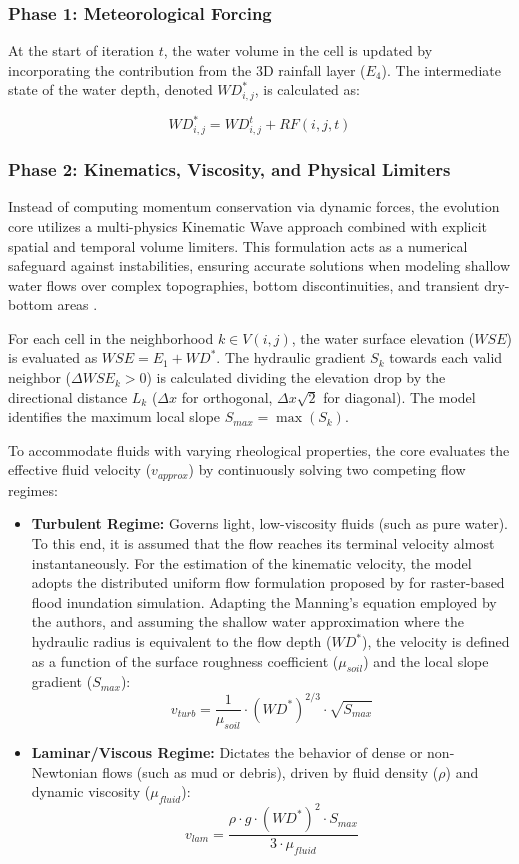 \subsubsection{Phase 1: Meteorological Forcing}

At the start of iteration $t$, the water volume in the cell is updated by incorporating the contribution from the 3D rainfall 
layer ($E_4$). The intermediate state of the water depth, denoted $WD_{i,j}^*$, is calculated as:

$$WD_{i,j}^* = WD_{i,j}^t + RF(i,j,t)$$


\subsubsection{Phase 2: Kinematics, Viscosity, and Physical Limiters}

Instead of computing momentum conservation via dynamic forces, the evolution core utilizes a multi-physics Kinematic Wave 
approach combined with explicit spatial and temporal volume limiters. This formulation acts as a numerical safeguard against 
instabilities, ensuring accurate solutions when modeling shallow water flows over complex topographies, bottom discontinuities, 
and transient dry-bottom areas \parencite{Aleksyuk2017}.

For each cell in the neighborhood $k \in V(i,j)$, the water surface elevation ($WSE$) is evaluated as $WSE = E_1 + WD^*$. The 
hydraulic gradient $S_k$ towards each valid neighbor ($\Delta WSE_k > 0$) is calculated dividing the elevation drop by the 
directional distance $L_k$ ($\Delta x$ for orthogonal, $\Delta x\sqrt{2}$ for diagonal). The model identifies the maximum local 
slope $S_{max} = \max(S_k)$.

To accommodate fluids with varying rheological properties, the core evaluates the effective fluid velocity ($v_{approx}$) by 
continuously solving two competing flow regimes:

\begin{itemize}
    \item \textbf{Turbulent Regime:} Governs light, low-viscosity fluids (such as pure water). To this end, it is assumed that 
    the flow reaches its terminal velocity almost instantaneously. For the estimation of the kinematic velocity, the model adopts 
    the distributed uniform flow formulation proposed by \parencite{Bates2000} for raster-based flood inundation simulation. 
    Adapting the Manning's equation employed by the authors, and assuming the shallow water approximation where the hydraulic 
    radius is equivalent to the flow depth ($WD^*$), the velocity is defined as a function of the surface roughness coefficient 
    ($\mu_{soil}$) and the local slope gradient ($S_{max}$):
    $$v_{turb} = \frac{1}{\mu_{soil}} \cdot (WD^*)^{2/3} \cdot \sqrt{S_{max}}$$
    
    \item \textbf{Laminar/Viscous Regime:} Dictates the behavior of dense or non-Newtonian flows (such as mud or debris), driven 
    by fluid density ($\rho$) and dynamic viscosity ($\mu_{fluid}$):
    $$v_{lam} = \frac{\rho \cdot g \cdot (WD^*)^2 \cdot S_{max}}{3 \cdot \mu_{fluid}}$$
\end{itemize}

